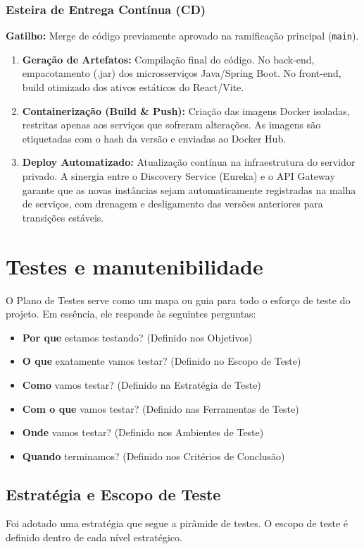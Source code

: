 \documentclass[
    12pt, 
    a4paper, 
    oneside, 
    chapter=TITLE, 
    section=TITLE
]{abntex2}
\begin{document}
\subsubsection{Esteira de Entrega Contínua (CD)}
\textbf{Gatilho:} Merge de código previamente aprovado na ramificação principal (\texttt{main}).
\begin{enumerate}
    \item \textbf{Geração de Artefatos:} Compilação final do código. No back-end, empacotamento (.jar) dos microsserviços Java/Spring Boot. No front-end, build otimizado dos ativos estáticos do React/Vite.
    \item \textbf{Containerização (Build \& Push):} Criação das imagens Docker isoladas, restritas apenas aos serviços que sofreram alterações. As imagens são etiquetadas com o hash da versão e enviadas ao Docker Hub.
    \item \textbf{Deploy Automatizado:} Atualização contínua na infraestrutura do servidor privado. A sinergia entre o Discovery Service (Eureka) e o API Gateway garante que as novas instâncias sejam automaticamente registradas na malha de serviços, com drenagem e desligamento das versões anteriores para transições estáveis.
\end{enumerate}

\section{Testes e manutenibilidade}
O Plano de Testes serve como um mapa ou guia para todo o esforço de teste do projeto. Em essência, ele responde às seguintes perguntas:
\begin{itemize}
    \item \textbf{Por que} estamos testando? (Definido nos Objetivos)
    \item \textbf{O que} exatamente vamos testar? (Definido no Escopo de Teste)
    \item \textbf{Como} vamos testar? (Definido na Estratégia de Teste)
    \item \textbf{Com o que} vamos testar? (Definido nas Ferramentas de Teste)
    \item \textbf{Onde} vamos testar? (Definido nos Ambientes de Teste)
    \item \textbf{Quando} terminamos? (Definido nos Critérios de Conclusão)
\end{itemize}

\subsection{Estratégia e Escopo de Teste}
Foi adotado uma estratégia que segue a pirâmide de testes. O escopo de teste é definido dentro de cada nível estratégico.
\end{document}
